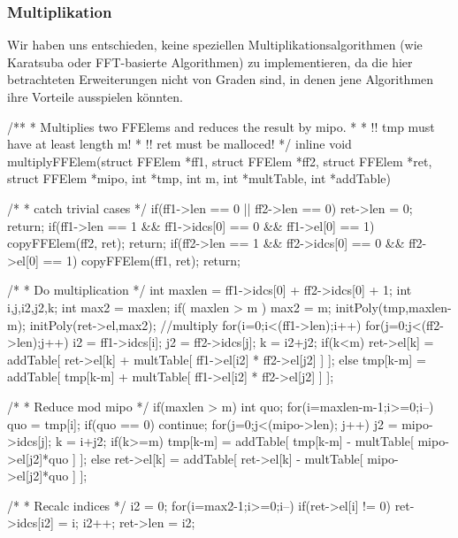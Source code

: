 \subsubsection{Multiplikation}
Wir haben uns entschieden, keine speziellen Multiplikationsalgorithmen 
(wie Karatsuba oder FFT-basierte Algorithmen) zu implementieren, da
die hier betrachteten Erweiterungen nicht von Graden sind, in denen jene
Algorithmen ihre Vorteile ausspielen könnten.

\begin{ccode}[caption={[\texttt{void multiplyFFElem} aus 
 \url{../Sage/enumeratePCNs.c}]Aus \url{../Sage/enumeratePCNs.c}}]
/**
 * Multiplies two FFElems and reduces the result by mipo.
 *
 * !! tmp must have at least length m!
 * !! ret must be malloced!
 */
inline void multiplyFFElem(struct FFElem *ff1, struct FFElem *ff2, 
        struct FFElem *ret, 
        struct FFElem *mipo, int *tmp, int m,
        int *multTable, int *addTable){
    /* 
     * catch trivial cases
     */
    if(ff1->len == 0 || ff2->len == 0){
        ret->len = 0;
        return;
    }
    if(ff1->len == 1 && ff1->idcs[0] == 0 && ff1->el[0] == 1){
        copyFFElem(ff2, ret);
        return;
    }
    if(ff2->len == 1 && ff2->idcs[0] == 0 && ff2->el[0] == 1){
        copyFFElem(ff1, ret);
        return;
    }

    /*
     * Do multiplication
     */
    int maxlen = ff1->idcs[0] + ff2->idcs[0] + 1;
    int i,j,i2,j2,k;
    int max2 = maxlen;
    if( maxlen > m ){
        max2 = m;
        initPoly(tmp,maxlen-m);
    }
    initPoly(ret->el,max2);
    //multiply 
    for(i=0;i<(ff1->len);i++){
        for(j=0;j<(ff2->len);j++){
            i2 = ff1->idcs[i];
            j2 = ff2->idcs[j];
            k = i2+j2;
            if(k<m){
                ret->el[k] = addTable[ ret->el[k] + 
                    multTable[ ff1->el[i2] * ff2->el[j2] ] ];
            }else{
                tmp[k-m] = addTable[ tmp[k-m] +
                    multTable[ ff1->el[i2] * ff2->el[j2] ] ];
            }
        }
    }
    
    /*
     * Reduce mod mipo
     */
    if(maxlen > m){
        int quo;
        for(i=maxlen-m-1;i>=0;i--){
            quo = tmp[i];
            if(quo == 0) continue;
            for(j=0;j<(mipo->len); j++){
                j2 = mipo->idcs[j];
                k = i+j2;
                if(k>=m){
                    tmp[k-m] = addTable[ tmp[k-m] - 
                        multTable[ mipo->el[j2]*quo ] ];
                }else{
                    ret->el[k] = addTable[ ret->el[k] - 
                        multTable[ mipo->el[j2]*quo ] ];
                }
            }
        }
    }

    /*
     * Recalc indices
     */
    i2 = 0;
    for(i=max2-1;i>=0;i--){
        if(ret->el[i] != 0){
            ret->idcs[i2] = i;
            i2++;
        }
    }
    ret->len = i2;
}
\end{ccode}
